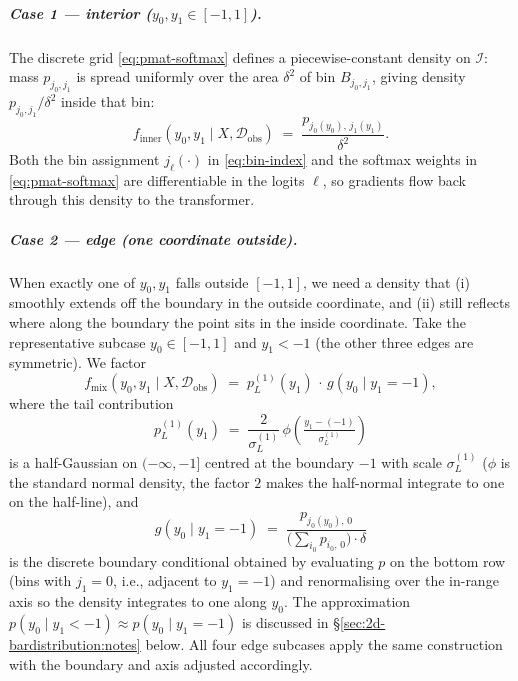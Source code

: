 \documentclass[11pt]{article}
\theoremstyle{plain}
\theoremstyle{definition}
\theoremstyle{remark}
\begin{document}
\subparagraph{Case 1 --- interior ($y_0, y_1 \in [-1, 1]$).}
The discrete grid \eqref{eq:pmat-softmax} defines a piecewise-constant
density on $\mathcal{I}$: mass $p_{j_0, j_1}$ is spread uniformly over
the area $\delta^2$ of bin $B_{j_0, j_1}$, giving density
$p_{j_0, j_1}/\delta^2$ inside that bin:
\begin{equation}
  f_{\mathrm{inner}}(y_0, y_1 \mid X, \mathcal{D}_{\mathrm{obs}})
  \;=\;
  \frac{p_{j_0(y_0),\, j_1(y_1)}}{\delta^{2}}.
  \label{eq:inner-density}
\end{equation}
Both the bin assignment $j_\ell(\cdot)$ in \eqref{eq:bin-index} and the
softmax weights in \eqref{eq:pmat-softmax} are differentiable in the
logits $\ell$, so gradients flow back through this density to the
transformer.

\subparagraph{Case 2 --- edge (one coordinate outside).}
When exactly one of $y_0, y_1$ falls outside $[-1, 1]$, we need a
density that (i) smoothly extends off the boundary in the outside
coordinate, and (ii) still reflects where along the boundary the point
sits in the inside coordinate. Take the representative subcase
$y_0 \in [-1, 1]$ and $y_1 < -1$ (the other three edges are
symmetric). We factor
\begin{equation}
  f_{\mathrm{mix}}(y_0, y_1 \mid X, \mathcal{D}_{\mathrm{obs}})
  \;=\;
  p_{L}^{(1)}(y_1)\, \cdot\, g(y_0 \mid y_1 = -1),
  \label{eq:mix-density}
\end{equation}
where the tail contribution
\begin{equation}
  p_{L}^{(1)}(y_1)
  \;=\;
  \frac{2}{\sigma_{L}^{(1)}}\,
  \phi\!\left(\tfrac{y_1 - (-1)}{\sigma_{L}^{(1)}}\right)
\end{equation}
is a half-Gaussian on $(-\infty, -1]$ centred at the boundary $-1$
with scale $\sigma_L^{(1)}$ ($\phi$ is the standard normal density,
the factor $2$ makes the half-normal integrate to one on the half-line),
and
\begin{equation}
  g(y_0 \mid y_1 = -1)
  \;=\;
  \frac{p_{j_0(y_0),\, 0}}
       {\bigl(\sum_{i_0} p_{i_0,\, 0}\bigr) \cdot \delta}
  \label{eq:boundary-conditional}
\end{equation}
is the discrete boundary conditional obtained by evaluating $p$ on the
bottom row (bins with $j_1 = 0$, i.e., adjacent to $y_1 = -1$) and
renormalising over the in-range axis so the density integrates to one
along $y_0$. The approximation
$p(y_0 \mid y_1 < -1) \approx p(y_0 \mid y_1 = -1)$
is discussed in \S\ref{sec:2d-bardistribution:notes} below. All four
edge subcases apply the same construction with the boundary and axis
adjusted accordingly.
\end{document}
